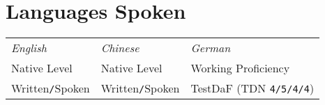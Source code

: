 \section{\textcolor{section_4}{Languages Spoken}}
\vspace{-\parskip}

	\begin{center}
		\fontsize{10}{12} %
		\begin{tabular}{@{} p{4cm} p{4cm} p{4.1cm} @{}}
			\textcolor{subheader}{\textit{English}} & \textcolor{subheader}{\textit{Chinese}} & \textcolor{subheader}{\textit{German}} \\
			Native Level & Native Level & Working Proficiency \\ 
			\textcolor{subtitles}{Written\texttt{/}Spoken} & \textcolor{subtitles}{Written\texttt{/}Spoken} & TestDaF (TDN \texttt{4/5/4/4})
		\end{tabular}
	\end{center}

